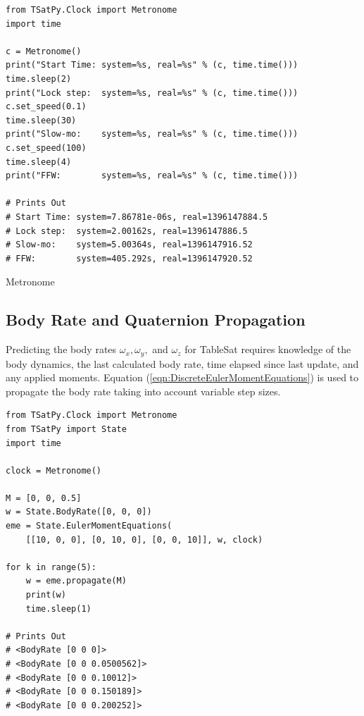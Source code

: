 \begin{listing}[H]
\begin{singlespace}
  \begin{verbatim}
from TSatPy.Clock import Metronome
import time

c = Metronome()
print("Start Time: system=%s, real=%s" % (c, time.time()))
time.sleep(2)
print("Lock step:  system=%s, real=%s" % (c, time.time()))
c.set_speed(0.1)
time.sleep(30)
print("Slow-mo:    system=%s, real=%s" % (c, time.time()))
c.set_speed(100)
time.sleep(4)
print("FFW:        system=%s, real=%s" % (c, time.time()))

# Prints Out
# Start Time: system=7.86781e-06s, real=1396147884.5
# Lock step:  system=2.00162s, real=1396147886.5
# Slow-mo:    system=5.00364s, real=1396147916.52
# FFW:        system=405.292s, real=1396147920.52
  \end{verbatim}
\caption{Metronome}
\label{code:metronome}
\nocite{minted}
\end{singlespace}
\end{listing}


\subsection{Body Rate and Quaternion Propagation}
\label{subsec:BodyRateQuaternionPropagation}

Predicting the body rates $\omega_x, \omega_y,$ and $\omega_z$ for TableSat requires knowledge of the body dynamics, the last calculated body rate, time elapsed since last update, and any applied moments.  Equation (\ref{eqn:DiscreteEulerMomentEquations}) is used to propagate the body rate taking into account variable step sizes.

\begin{singlespace}
  \begin{verbatim}
from TSatPy.Clock import Metronome
from TSatPy import State
import time

clock = Metronome()

M = [0, 0, 0.5]
w = State.BodyRate([0, 0, 0])
eme = State.EulerMomentEquations(
    [[10, 0, 0], [0, 10, 0], [0, 0, 10]], w, clock)

for k in range(5):
    w = eme.propagate(M)
    print(w)
    time.sleep(1)

# Prints Out
# <BodyRate [0 0 0]>
# <BodyRate [0 0 0.0500562]>
# <BodyRate [0 0 0.10012]>
# <BodyRate [0 0 0.150189]>
# <BodyRate [0 0 0.200252]>
  \end{verbatim}
\nocite{minted}
\end{singlespace}

